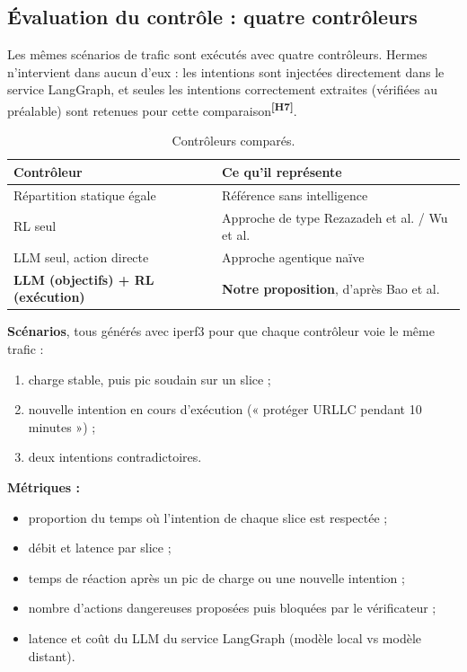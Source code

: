 \documentclass[11pt,a4paper]{article}
\newcommand{\hyp}[1]{\textsuperscript{\textbf{[H#1]}}}
\begin{document}
\subsection{Évaluation du contrôle : quatre contrôleurs}

Les mêmes scénarios de trafic sont exécutés avec quatre contrôleurs. Hermes n'intervient
dans aucun d'eux : les intentions sont injectées directement dans le service LangGraph, et
seules les intentions correctement extraites (vérifiées au préalable) sont retenues pour
cette comparaison\hyp{7}.

\begin{table}[H]
\centering\small
\begin{tabularx}{\textwidth}{@{}P{5cm}L@{}}
\toprule
Contrôleur & Ce qu'il représente\\
\midrule
Répartition statique égale & Référence sans intelligence\\
RL seul & Approche de type Rezazadeh et al. / Wu et al.\\
LLM seul, action directe & Approche agentique naïve\\
\textbf{LLM (objectifs) + RL (exécution)} & \textbf{Notre proposition}, d'après Bao et al.\\
\bottomrule
\end{tabularx}
\caption{Contrôleurs comparés.}
\end{table}

\textbf{Scénarios}, tous générés avec iperf3 pour que chaque contrôleur voie le même trafic :
\begin{enumerate}
  \item charge stable, puis pic soudain sur un slice ;
  \item nouvelle intention en cours d'exécution (« protéger URLLC pendant 10 minutes ») ;
  \item deux intentions contradictoires.
\end{enumerate}

\textbf{Métriques :}
\begin{itemize}
  \item proportion du temps où l'intention de chaque slice est respectée ;
  \item débit et latence par slice ;
  \item temps de réaction après un pic de charge ou une nouvelle intention ;
  \item nombre d'actions dangereuses proposées puis bloquées par le vérificateur ;
  \item latence et coût du LLM du service LangGraph (modèle local vs modèle distant).
\end{itemize}
\end{document}
